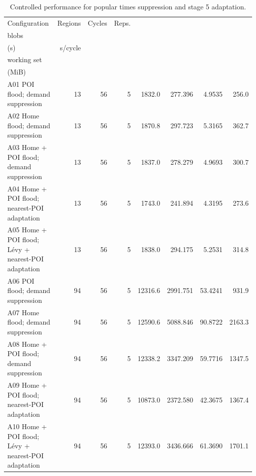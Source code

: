 \begin{table}[htbp]
\centering
\caption{Controlled performance for popular times suppression and stage 5 adaptation.}
\label{tab:quantitative-performance-adaptation}
\begin{tabularx}{\textwidth}{@{}>{\raggedright\arraybackslash}Xrrrrrrr@{}}
\toprule
Configuration & Regions & Cycles & Reps. & \begin{tabular}[c]{@{}c@{}}Mean max.\\blobs\end{tabular} & \begin{tabular}[c]{@{}c@{}}Mean runtime\\(s)\end{tabular} & s/cycle & \begin{tabular}[c]{@{}c@{}}Mean peak\\working set\\(MiB)\end{tabular} \\
\midrule
A01 POI flood; demand suppression & 13 & 56 & 5 & 1832.0 & 277.396 & 4.9535 & 256.0 \\
A02 Home flood; demand suppression & 13 & 56 & 5 & 1870.8 & 297.723 & 5.3165 & 362.7 \\
A03 Home + POI flood; demand suppression & 13 & 56 & 5 & 1837.0 & 278.279 & 4.9693 & 300.7 \\
A04 Home + POI flood; nearest-POI adaptation & 13 & 56 & 5 & 1743.0 & 241.894 & 4.3195 & 273.6 \\
A05 Home + POI flood; Lévy + nearest-POI adaptation & 13 & 56 & 5 & 1838.0 & 294.175 & 5.2531 & 314.8 \\
A06 POI flood; demand suppression & 94 & 56 & 5 & 12316.6 & 2991.751 & 53.4241 & 931.9 \\
A07 Home flood; demand suppression & 94 & 56 & 5 & 12590.6 & 5088.846 & 90.8722 & 2163.3 \\
A08 Home + POI flood; demand suppression & 94 & 56 & 5 & 12338.2 & 3347.209 & 59.7716 & 1347.5 \\
A09 Home + POI flood; nearest-POI adaptation & 94 & 56 & 5 & 10873.0 & 2372.580 & 42.3675 & 1367.4 \\
A10 Home + POI flood; Lévy + nearest-POI adaptation & 94 & 56 & 5 & 12393.0 & 3436.666 & 61.3690 & 1701.1 \\
\bottomrule
\end{tabularx}
\end{table}

